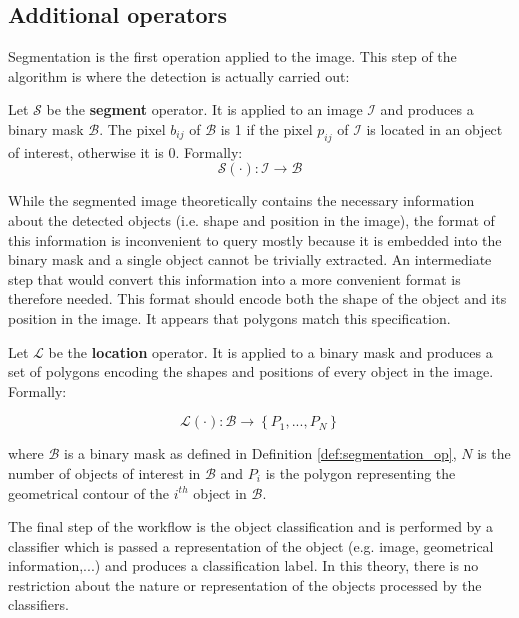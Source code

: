 \subsection{Additional operators}
\label{ssec:other_operators}

Segmentation is the first operation applied to the image. This step of the algorithm is where the detection is actually carried out:
 
\begin{definition} \label{def:segmentation_op}
Let $\mathcal{S}$ be the \textbf{segment} operator. It is applied to an image $\mathcal{I}$ and produces a binary mask $\mathcal{B}$. The pixel $b_{ij}$ of $\mathcal{B}$ is 1 if the pixel $p_{ij}$ of $\mathcal{I}$ is located in an object of interest, otherwise it is 0. Formally:
\begin{equation}
	\label{eqn:operator_segment}
	\mathcal{S}(\cdot) : \mathcal{I} \rightarrow \mathcal{B}
\end{equation}
\end{definition}

While the segmented image theoretically contains the necessary information about the detected objects (i.e. shape and position in the image), the format of this information is inconvenient to query mostly because it is embedded into the binary mask and a single object cannot be trivially extracted. An intermediate step that would convert this information into a more convenient format is therefore needed. This format should encode both the shape of the object and its position in the image. It appears that polygons match this specification. 

\begin{definition} \label{def:locate_op}
Let $\mathcal{L}$ be the \textbf{location} operator. It is applied to a binary mask and produces a set of polygons encoding the shapes and positions of every object in the image. Formally:

\begin{equation}
	\mathcal{L}(\cdot) : \mathcal{B} \rightarrow \left\{P_1, ..., P_N\right\}
\end{equation}

where $\mathcal{B}$ is a binary mask as defined in Definition \ref{def:segmentation_op}, $N$ is the number of objects of interest in $\mathcal{B}$ and $P_i$ is the polygon representing the geometrical contour of the $i^{th}$ object in $\mathcal{B}$.
\end{definition}

The final step of the workflow is the object classification and is performed by a classifier which is passed a representation of the object (e.g. image, geometrical information,...) and produces a classification label. In this theory, there is no restriction about the nature or representation of the objects processed by the classifiers.

